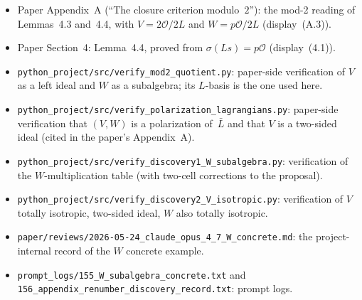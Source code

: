\documentclass[11pt]{amsart}
\begin{document}
\begin{itemize}
\item Paper Appendix~A (``The closure criterion modulo~$2$''): the mod-2
  reading of Lemmas~4.3 and~4.4, with $V = 2\mathcal O/2L$ and
  $W = p\mathcal O/2L$ (display~(A.3)).
\item Paper Section~4: Lemma~4.4, proved from
  $\sigma(Ls) = p\mathcal O$ (display~(4.1)).
\item \texttt{python\_project/src/verify\_mod2\_quotient.py}: paper-side
  verification of $V$ as a left ideal and $W$ as a subalgebra; its
  $L$-basis is the one used here.
\item \texttt{python\_project/src/verify\_polarization\_lagrangians.py}:
  paper-side verification that $(V, W)$ is a polarization of~$\bar L$ and
  that $V$ is a two-sided ideal (cited in the paper's Appendix~A).
\item \texttt{python\_project/src/verify\_discovery1\_W\_subalgebra.py}:
  verification of the $W$-multiplication table (with two-cell
  corrections to the proposal).
\item \texttt{python\_project/src/verify\_discovery2\_V\_isotropic.py}:
  verification of $V$ totally isotropic, two-sided ideal, $W$ also
  totally isotropic.
\item \texttt{paper/reviews/2026-05-24\_claude\_opus\_4\_7\_W\_concrete.md}:
  the project-internal record of the $W$ concrete example.
\item \texttt{prompt\_logs/155\_W\_subalgebra\_concrete.txt} and
  \texttt{156\_appendix\_renumber\_discovery\_record.txt}: prompt logs.
\end{itemize}
\end{document}
